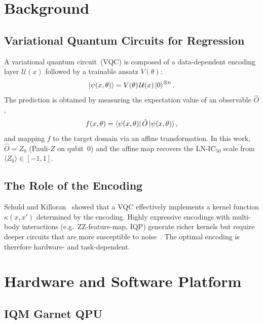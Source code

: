 \documentclass[twocolumn,aps,pra,superscriptaddress,floatfix]{revtex4-2}
\newcommand{\expvz}{\ensuremath{\langle Z_0 \rangle}}
\begin{document}
\section{Background}
\label{sec:background}

\subsection{Variational Quantum Circuits for Regression}

A variational quantum circuit~(VQC) is composed of a data-dependent encoding
layer $\mathcal{U}(x)$ followed by a trainable ansatz $V(\theta)$:
\begin{equation}
  \ket{\psi(x,\theta)} = V(\theta)\,\mathcal{U}(x)\ket{0}^{\otimes n}.
\end{equation}
The prediction is obtained by measuring the expectation value of an observable
$\hat{O}$,
\begin{equation}
  f(x,\theta) = \bra{\psi(x,\theta)}\hat{O}\ket{\psi(x,\theta)},
\end{equation}
and mapping $f$ to the target domain via an affine transformation.
In this work, $\hat{O} = Z_0$ (Pauli-$Z$ on qubit~0) and the affine map
recovers the LN-IC$_{50}$ scale from $\expvz\in[-1,1]$.

\subsection{The Role of the Encoding}

Schuld and Killoran~\cite{schuld2021kernel} showed that a VQC effectively
implements a kernel function $\kappa(x,x')$ determined by the encoding.
Highly expressive encodings with multi-body interactions (e.g.\ ZZ-feature-map,
IQP) generate richer kernels but require deeper circuits that are more
susceptible to noise~\cite{wang2021noise}.
The optimal encoding is therefore hardware- and task-dependent.

\section{Hardware and Software Platform}
\label{sec:platform}

\subsection{IQM Garnet QPU}
\end{document}
